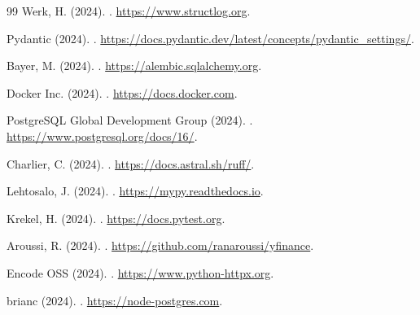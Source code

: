 \begin{thebibliography}{99}
Werk, H. (2024).
\newblock {}.
\newblock \url{https://www.structlog.org}.

Pydantic (2024).
\newblock {}.
\newblock \url{https://docs.pydantic.dev/latest/concepts/pydantic_settings/}.

Bayer, M. (2024).
\newblock {}.
\newblock \url{https://alembic.sqlalchemy.org}.

Docker Inc. (2024).
\newblock {}.
\newblock \url{https://docs.docker.com}.

PostgreSQL Global Development Group (2024).
\newblock {}.
\newblock \url{https://www.postgresql.org/docs/16/}.

Charlier, C. (2024).
\newblock {}.
\newblock \url{https://docs.astral.sh/ruff/}.

Lehtosalo, J. (2024).
\newblock {}.
\newblock \url{https://mypy.readthedocs.io}.

Krekel, H. (2024).
\newblock {}.
\newblock \url{https://docs.pytest.org}.

Aroussi, R. (2024).
\newblock {}.
\newblock \url{https://github.com/ranaroussi/yfinance}.

Encode OSS (2024).
\newblock {}.
\newblock \url{https://www.python-httpx.org}.

brianc (2024).
\newblock {}.
\newblock \url{https://node-postgres.com}.

\end{thebibliography}
